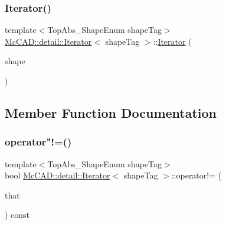 \subsubsection{\texorpdfstring{Iterator()}{Iterator()}\hspace{0.1cm}{\footnotesize\ttfamily [2/2]}}
{\footnotesize\ttfamily template$<$Top\+Abs\+\_\+\+Shape\+Enum shape\+Tag$>$ \\
\hyperlink{classMcCAD_1_1detail_1_1Iterator}{Mc\+C\+A\+D\+::detail\+::\+Iterator}$<$ shape\+Tag $>$\+::\hyperlink{classMcCAD_1_1detail_1_1Iterator}{Iterator} (\begin{DoxyParamCaption}\item[{const Topo\+D\+S\+\_\+\+Shape \&}]{shape }\end{DoxyParamCaption})}



\subsection{Member Function Documentation}
\mbox{\label{classMcCAD_1_1detail_1_1Iterator_ac12679f4148d74b4a812e8cc3f260ada}} 
\subsubsection{\texorpdfstring{operator"!=()}{operator!=()}}
{\footnotesize\ttfamily template$<$Top\+Abs\+\_\+\+Shape\+Enum shape\+Tag$>$ \\
bool \hyperlink{classMcCAD_1_1detail_1_1Iterator}{Mc\+C\+A\+D\+::detail\+::\+Iterator}$<$ shape\+Tag $>$\+::operator!= (\begin{DoxyParamCaption}\item[{const \hyperlink{classMcCAD_1_1detail_1_1Iterator}{Iterator}$<$ shape\+Tag $>$ \&}]{that }\end{DoxyParamCaption}) const}

\mbox{\label{classMcCAD_1_1detail_1_1Iterator_af292a9686a6fe67635de0cea6b807f7f}} 
